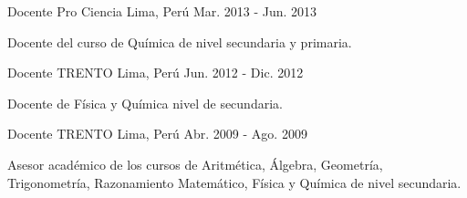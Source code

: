 \begin{cventries}
  \cventry
    {Docente} %
    {Pro Ciencia} %
    {Lima, Perú} %
    {Mar. 2013 - Jun. 2013} %
    {
      \begin{cvitems} %
        \item {Docente del curso de Química de nivel secundaria y primaria.}
      \end{cvitems}
    }

  \cventry
    {Docente} %
    {TRENTO} %
    {Lima, Perú} %
    {Jun. 2012 - Dic. 2012} %
    {
      \begin{cvitems} %
        \item {Docente de Física y Química nivel de secundaria.}
      \end{cvitems}
    }

  \cventry
    {Docente} %
    {TRENTO} %
    {Lima, Perú} %
    {Abr. 2009 - Ago. 2009} %
    {
      \begin{cvitems} %
        \item {Asesor académico de los cursos de Aritmética, Álgebra, Geometría,
        Trigonometría, Razonamiento Matemático, Física y Química de nivel
        secundaria.}
      \end{cvitems}
    }

\end{cventries}
